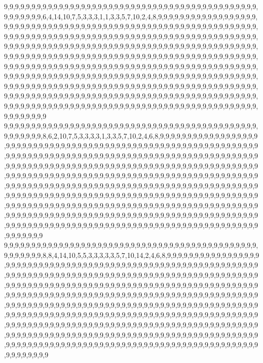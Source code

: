9,9,9,9,9,9,9,9,9,9,9,9,9,9,9,9,9,9,9,9,9,9,9,9,9,9,9,9,9,9,9,9,9,9,9,9,9,9,9,9,9,9,9,9,9,9,9,9,9,9,9,9,9,6,4,14,10,7,5,3,3,3,1,1,3,3,5,7,10,2,4,8,9,9,9,9,9,9,9,9,9,9,9,9,9,9,9,9,9,9,9,9,9,9,9,9,9,9,9,9,9,9,9,9,9,9,9,9,9,9,9,9,9,9,9,9,9,9,9,9,9,9,9,9,9,9,9,9,9,9,9,9,9,9,9,9,9,9,9,9,9,9,9,9,9,9,9,9,9,9,9,9,9,9,9,9,9,9,9,9,9,9,9,9,9,9,9,9,9,9,9,9,9,9,9,9,9,9,9,9,9,9,9,9,9,9,9,9,9,9,9,9,9,9,9,9,9,9,9,9,9,9,9,9,9,9,9,9,9,9,9,9,9,9,9,9,9,9,9,9,9,9,9,9,9,9,9,9,9,9,9,9,9,9,9,9,9,9,9,9,9,9,9,9,9,9,9,9,9,9,9,9,9,9,9,9,9,9,9,9,9,9,9,9,9,9,9,9,9,9,9,9,9,9,9,9,9,9,9,9,9,9,9,9,9,9,9,9,9,9,9,9,9,9,9,9,9,9,9,9,9,9,9,9,9,9,9,9,9,9,9,9,9,9,9,9,9,9,9,9,9,9,9,9,9,9,9,9,9,9,9,9,9,9,9,9,9,9,9,9,9,9,9,9,9,9,9,9,9,9,9,9,9,9,9,9,9,9,9,9,9,9,9,9,9,9,9,9,9,9,9,9,9,9,9,9,9,9,9,9,9,9,9,9,9,9,9,9,9,9,9,9,9,9,9,9,9,9,9,9,9,9,9,9,9,9,9,9,9,9,9,9,9,9,9,9,9,9,9,9,9,9,9,9,9,9,9,9,9,9,9,9,9,9,9,9,9,9,9,9,9,9,9,9,9,9,9,9,9,9,9,9,9,9,9,9,9,9,9,9,9,9,9,9,9,9,9,9,9,9,9,9,9,9,9,9,9,9,9,9,9,9,9,9,9,9,9,9,9,9,9,9,9,9,9,9,9,9,9,9,9,9,9,9,9,9,9,9,9,9,9,9
9,9,9,9,9,9,9,9,9,9,9,9,9,9,9,9,9,9,9,9,9,9,9,9,9,9,9,9,9,9,9,9,9,9,9,9,9,9,9,9,9,9,9,9,9,9,9,9,9,9,9,9,9,8,6,2,10,7,5,3,3,3,3,1,3,3,5,7,10,2,4,6,8,9,9,9,9,9,9,9,9,9,9,9,9,9,9,9,9,9,9,9,9,9,9,9,9,9,9,9,9,9,9,9,9,9,9,9,9,9,9,9,9,9,9,9,9,9,9,9,9,9,9,9,9,9,9,9,9,9,9,9,9,9,9,9,9,9,9,9,9,9,9,9,9,9,9,9,9,9,9,9,9,9,9,9,9,9,9,9,9,9,9,9,9,9,9,9,9,9,9,9,9,9,9,9,9,9,9,9,9,9,9,9,9,9,9,9,9,9,9,9,9,9,9,9,9,9,9,9,9,9,9,9,9,9,9,9,9,9,9,9,9,9,9,9,9,9,9,9,9,9,9,9,9,9,9,9,9,9,9,9,9,9,9,9,9,9,9,9,9,9,9,9,9,9,9,9,9,9,9,9,9,9,9,9,9,9,9,9,9,9,9,9,9,9,9,9,9,9,9,9,9,9,9,9,9,9,9,9,9,9,9,9,9,9,9,9,9,9,9,9,9,9,9,9,9,9,9,9,9,9,9,9,9,9,9,9,9,9,9,9,9,9,9,9,9,9,9,9,9,9,9,9,9,9,9,9,9,9,9,9,9,9,9,9,9,9,9,9,9,9,9,9,9,9,9,9,9,9,9,9,9,9,9,9,9,9,9,9,9,9,9,9,9,9,9,9,9,9,9,9,9,9,9,9,9,9,9,9,9,9,9,9,9,9,9,9,9,9,9,9,9,9,9,9,9,9,9,9,9,9,9,9,9,9,9,9,9,9,9,9,9,9,9,9,9,9,9,9,9,9,9,9,9,9,9,9,9,9,9,9,9,9,9,9,9,9,9,9,9,9,9,9,9,9,9,9,9,9,9,9,9,9,9,9,9,9,9,9,9,9,9,9,9,9,9,9,9,9,9,9,9,9,9,9,9,9,9,9,9,9,9,9,9,9,9,9,9,9,9,9,9,9,9,9,9,9,9,9,9,9,9,9,9,9,9,9,9,9,9,9
9,9,9,9,9,9,9,9,9,9,9,9,9,9,9,9,9,9,9,9,9,9,9,9,9,9,9,9,9,9,9,9,9,9,9,9,9,9,9,9,9,9,9,9,9,9,9,9,9,9,9,9,9,8,8,4,14,10,5,5,3,3,3,3,3,5,7,10,14,2,4,6,8,9,9,9,9,9,9,9,9,9,9,9,9,9,9,9,9,9,9,9,9,9,9,9,9,9,9,9,9,9,9,9,9,9,9,9,9,9,9,9,9,9,9,9,9,9,9,9,9,9,9,9,9,9,9,9,9,9,9,9,9,9,9,9,9,9,9,9,9,9,9,9,9,9,9,9,9,9,9,9,9,9,9,9,9,9,9,9,9,9,9,9,9,9,9,9,9,9,9,9,9,9,9,9,9,9,9,9,9,9,9,9,9,9,9,9,9,9,9,9,9,9,9,9,9,9,9,9,9,9,9,9,9,9,9,9,9,9,9,9,9,9,9,9,9,9,9,9,9,9,9,9,9,9,9,9,9,9,9,9,9,9,9,9,9,9,9,9,9,9,9,9,9,9,9,9,9,9,9,9,9,9,9,9,9,9,9,9,9,9,9,9,9,9,9,9,9,9,9,9,9,9,9,9,9,9,9,9,9,9,9,9,9,9,9,9,9,9,9,9,9,9,9,9,9,9,9,9,9,9,9,9,9,9,9,9,9,9,9,9,9,9,9,9,9,9,9,9,9,9,9,9,9,9,9,9,9,9,9,9,9,9,9,9,9,9,9,9,9,9,9,9,9,9,9,9,9,9,9,9,9,9,9,9,9,9,9,9,9,9,9,9,9,9,9,9,9,9,9,9,9,9,9,9,9,9,9,9,9,9,9,9,9,9,9,9,9,9,9,9,9,9,9,9,9,9,9,9,9,9,9,9,9,9,9,9,9,9,9,9,9,9,9,9,9,9,9,9,9,9,9,9,9,9,9,9,9,9,9,9,9,9,9,9,9,9,9,9,9,9,9,9,9,9,9,9,9,9,9,9,9,9,9,9,9,9,9,9,9,9,9,9,9,9,9,9,9,9,9,9,9,9,9,9,9,9,9,9,9,9,9,9,9,9,9,9,9,9,9,9,9,9,9,9,9,9,9,9,9,9,9,9,9,9,9,9,9,9,9,9
